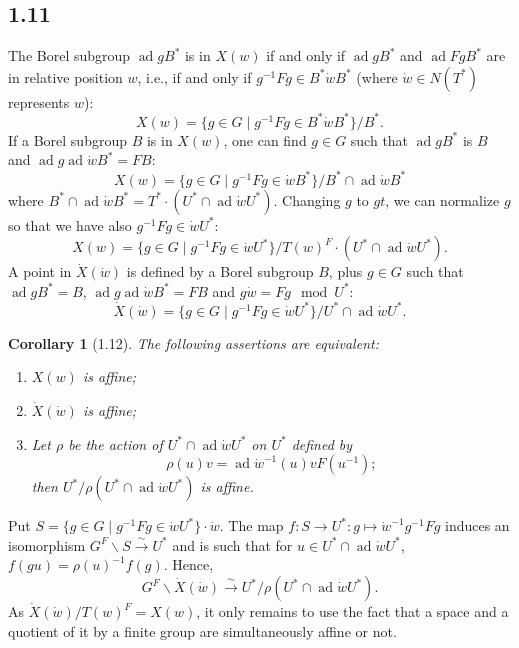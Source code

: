 \documentclass[11pt]{amsart}
\theoremstyle{plain}
\newtheorem{corollary}[theorem]{Corollary}
\theoremstyle{remark}
\DeclareMathOperator{\ad}{ad}
\begin{document}
\subsection{1.11} The Borel subgroup $\ad g B^*$ is in $X(w)$ if and only if $\ad g B^*$ and $\ad Fg B^*$ are in relative position $w$, i.e., if and only if $g^{-1}Fg \in B^*\dot{w}B^*$ (where $\dot{w} \in N(T^*)$ represents $w$):
\begin{equation}\label{eq:1.11.1}
X(w) = \{g \in G \mid g^{-1}Fg \in B^*\dot{w}B^*\}/B^*.
\end{equation}
If a Borel subgroup $B$ is in $X(w)$, one can find $g \in G$ such that $\ad g B^*$ is $B$ and $\ad g \ad\dot{w} B^* = FB$:
\begin{equation}\label{eq:1.11.2}
X(w) = \{g \in G \mid g^{-1}Fg \in \dot{w}B^*\}/B^* \cap \ad\dot{w}B^*
\end{equation}
where $B^* \cap \ad\dot{w}B^* = T^* \cdot (U^* \cap \ad\dot{w}U^*)$. Changing $g$ to $gt$, we can normalize $g$ so that we have also $g^{-1}Fg \in \dot{w}U^*$:
\begin{equation}\label{eq:1.11.3}
X(w) = \{g \in G \mid g^{-1}Fg \in \dot{w}U^*\}/T(w)^F \cdot (U^* \cap \ad\dot{w}U^*).
\end{equation}
A point in $\dot{X}(\dot{w})$ is defined by a Borel subgroup $B$, plus $g \in G$ such that $\ad g B^* = B$, $\ad g \ad\dot{w} B^* = FB$ and $g\dot{w} = Fg \mod U^*$:
\begin{equation}\label{eq:1.11.4}
\dot{X}(\dot{w}) = \{g \in G \mid g^{-1}Fg \in \dot{w}U^*\}/U^* \cap \ad\dot{w}U^*.
\end{equation}

\begin{corollary}[1.12]
The following assertions are equivalent:
\begin{enumerate}
\item[(i)] $X(w)$ is affine;
\item[(ii)] $\dot{X}(\dot{w})$ is affine;
\item[(iii)] Let $\rho$ be the action of $U^* \cap \ad\dot{w}U^*$ on $U^*$ defined by
\[
\rho(u)v = \ad\dot{w}^{-1}(u) v F(u^{-1});
\]
then $U^*/\rho(U^* \cap \ad\dot{w}U^*)$ is affine.
\end{enumerate}
\end{corollary}

Put $S = \{g \in G \mid g^{-1}Fg \in \dot{w}U^*\} \cdot \dot{w}$. The map $f: S \to U^*: g \mapsto \dot{w}^{-1}g^{-1}Fg$ induces an isomorphism $G^F\backslash S \xrightarrow{\sim} U^*$ and is such that for $u \in U^* \cap \ad\dot{w}U^*$,
$f(gu) = \rho(u)^{-1}f(g)$. Hence,
\[
G^F\backslash \dot{X}(\dot{w}) \xrightarrow{\sim} U^*/\rho(U^* \cap \ad\dot{w}U^*).
\]
As $\dot{X}(\dot{w})/T(w)^F = X(w)$, it only remains to use the fact that a space and a quotient of it by a finite group are simultaneously affine or not.
\end{document}
